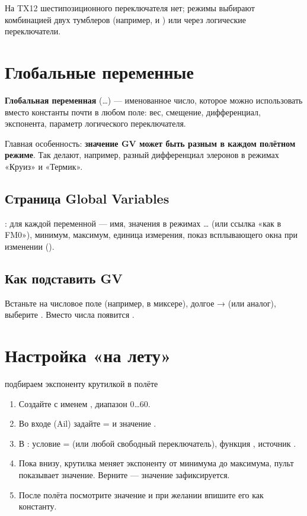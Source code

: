 На TX12 шестипозиционного переключателя нет; режимы выбирают комбинацией двух тумблеров
(например,  и ) или через логические переключатели.

\section{Глобальные переменные}

\textbf{Глобальная переменная} (…) --- именованное число, которое можно
использовать вместо константы почти в любом поле: вес, смещение, дифференциал, экспонента,
параметр логического переключателя.

Главная особенность: \textbf{значение GV может быть разным в каждом полётном режиме}. Так
делают, например, разный дифференциал элеронов в режимах «Круиз» и «Термик».

\subsection{Страница Global Variables}

: для каждой переменной --- имя, значения в режимах
… (или ссылка «как в FM0»), минимум, максимум, единица измерения,
показ всплывающего окна при изменении ().

\subsection{Как подставить GV}

Встаньте на числовое поле (например,  в миксере), долгое  →
 (или аналог), выберите . Вместо числа появится .

\section{Настройка «на лету»}

\begin{recipe}{подбираем экспоненту крутилкой в полёте}
\begin{enumerate}
  \item Создайте  с именем , диапазон 0…60.
  \item Во входе  (Ail) задайте  =  и значение .
  \item В : условие =  (или любой свободный
        переключатель), функция , источник .
  \item Пока  внизу, крутилка  меняет экспоненту от минимума до максимума,
        пульт показывает значение. Верните  --- значение зафиксируется.
  \item После полёта посмотрите значение  и при желании впишите его как константу.
\end{enumerate}
\end{recipe}

